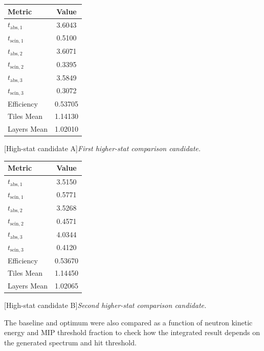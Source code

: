 \begin{center}
    \vspace{0.75cm}

    \begin{minipage}[t]{0.47\textwidth}
        \centering
        \begin{tabular}{lc}
            \toprule
            Metric & Value \\
            \midrule
            $t_{\mathrm{abs},1}$ & 3.6043 \\
            $t_{\mathrm{scin},1}$ & 0.5100 \\
            $t_{\mathrm{abs},2}$ & 3.6071 \\
            $t_{\mathrm{scin},2}$ & 0.3395 \\
            $t_{\mathrm{abs},3}$ & 3.5849 \\
            $t_{\mathrm{scin},3}$ & 0.3072 \\
            Efficiency & 0.53705 \\
            Tiles Mean & 1.14130 \\
            Layers Mean & 1.02010 \\
            \bottomrule
        \end{tabular}
        [High-stat candidate A]{\it First higher-stat comparison candidate.}
        \label{tab:rerun_a_geometry}
    \end{minipage}
    \hfill
    \begin{minipage}[t]{0.47\textwidth}
        \centering
        \begin{tabular}{lc}
            \toprule
            Metric & Value \\
            \midrule
            $t_{\mathrm{abs},1}$ & 3.5150 \\
            $t_{\mathrm{scin},1}$ & 0.5771 \\
            $t_{\mathrm{abs},2}$ & 3.5268 \\
            $t_{\mathrm{scin},2}$ & 0.4571 \\
            $t_{\mathrm{abs},3}$ & 4.0344 \\
            $t_{\mathrm{scin},3}$ & 0.4120 \\
            Efficiency & 0.53670 \\
            Tiles Mean & 1.14450 \\
            Layers Mean & 1.02065 \\
            \bottomrule
        \end{tabular}
        [High-stat candidate B]{\it Second higher-stat comparison candidate.}
        \label{tab:rerun_b_geometry}
    \end{minipage}
\end{center}
\noindent The baseline and optimum were also compared as a function of neutron kinetic energy and MIP threshold fraction to check how the integrated result depends on the generated spectrum 
and hit threshold.

